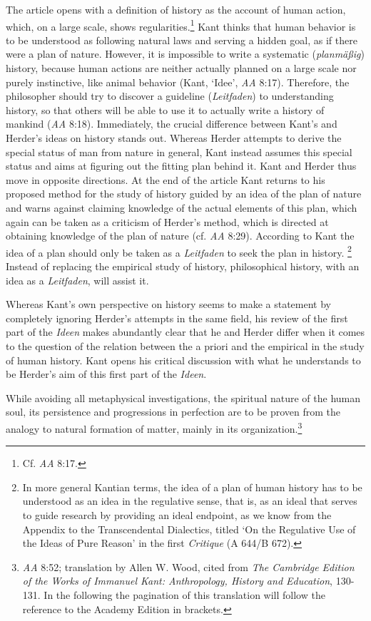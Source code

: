 The article opens with a definition of history as the account of human action, which, on a large scale, shows regularities.\footnote{ Cf. \textit{AA} 8:17. } Kant thinks that human behavior is to be understood as following natural laws and serving a hidden goal, as if there were a plan of nature. However, it is impossible to write a systematic (\textit{planm\"{a}\ss{}ig}) history, because human actions are neither actually planned on a large scale nor purely instinctive, like animal behavior (Kant, `Idee', \textit{AA} 8:17). Therefore, the philosopher should try to discover a guideline (\textit{Leitfaden}) to understanding history, so that others will be able to use it to actually write a history of mankind (\textit{AA} 8:18). Immediately, the crucial difference between Kant's and Herder's ideas on history stands out. Whereas Herder attempts to derive the special status of man from nature in general, Kant instead assumes this special status and aims at figuring out the fitting plan behind it. Kant and Herder thus move in opposite directions. At the end of the article Kant returns to his proposed method for the study of history guided by an idea of the plan of nature and warns against claiming knowledge of the actual elements of this plan, which again can be taken as a criticism of Herder's method, which is directed at obtaining knowledge of the plan of nature (cf. \textit{AA} 8:29). According to Kant the idea of a plan should only be taken as a \textit{Leitfaden} to seek the plan in history. \footnote{ In more general Kantian terms, the idea of a plan of human history has to be understood as an idea in the regulative sense, that is, as an ideal that serves to guide research by providing an ideal endpoint, as we know from the Appendix to the Transcendental Dialectics, titled `On the Regulative Use of the Ideas of Pure Reason' in the first \textit{Critique} (A 644/B 672). } Instead of replacing the empirical study of history, philosophical history, with an idea as a \textit{Leitfaden}, will assist it.

 Whereas Kant's own perspective on history seems to make a statement by completely ignoring Herder's attempts in the same field, his review of the first part of the \textit{Ideen} makes abundantly clear that he and Herder differ when it comes to the question of the relation between the a priori and the empirical in the study of human history. Kant opens his critical discussion with what he understands to be Herder's aim of this first part of the \textit{Ideen}. 

While avoiding all metaphysical investigations, the spiritual nature of the human soul, its persistence and progressions in perfection are to be proven from the analogy to natural formation of matter, mainly in its organization.\footnote{ \textit{AA} 8:52; translation by Allen W. Wood, cited from \textit{The Cambridge Edition of the Works of Immanuel Kant: Anthropology, History and Education}, 130{-}131. In the following the pagination of this translation will follow the reference to the Academy Edition in brackets. } 

